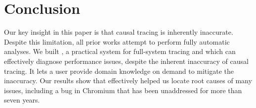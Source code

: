 \section{Conclusion} \label{sec:conclusion}

Our key insight in this paper is that causal tracing is inherently inaccurate.
Despite this limitation, all prior works attempt to perform fully automatic analyses.
We built \xxx, a practical system for full-system tracing and which can
effectively diagnose performance issues, despite the inherent inaccuracy of
causal tracing. It lets a user provide domain knowledge on demand to mitigate
the inaccuracy. Our results show that \xxx effectively helped us locate root
causes of many issues, including a bug in Chromium that has been unaddressed for
more than seven years.
\clearpage
